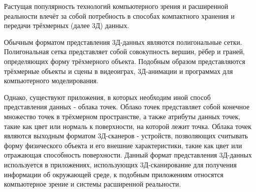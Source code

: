 Растущая популярность\cite{XRgrows} технологий компьютерного зрения и
расширенной реальности влечёт за собой потребность в способах компактного
хранения и передачи трёхмерных (далее 3Д) данных.

Обычным форматом представления 3Д-данных являются полигональные сетки.
Полигональная сетка представляет собой совокупность вершин, рёбер и граней,
определяющих форму трёхмерного объекта. Подобным образом представляются
трёхмерные объекты и сцены в видеоиграх, 3Д-анимации и программах для
компьютерного моделирования.

Однако, существуют приложения, в которых необходим иной способ представления
данных - облака точек. Облако точек представляет собой конечное множество точек
в трёхмерном пространстве, а также атрибуты данных точек, такие как цвет или
нормаль к поверхности, на которой лежит точка. Облака точек являются выходным
форматом 3Д-сканеров - устройств, позволяющих считывать форму физического
объекта и его внешние характеристики, такие как цвет или отражающая способность
поверхности\cite[10]{SurfaceReconstruction}. Данный формат представления
3Д-данных используется в приложениях, использующих 3Д-сканирование для получения
информации об окружающей среде, к подобным приложениям относятся компьютерное
зрение и системы расширенной реальности.







